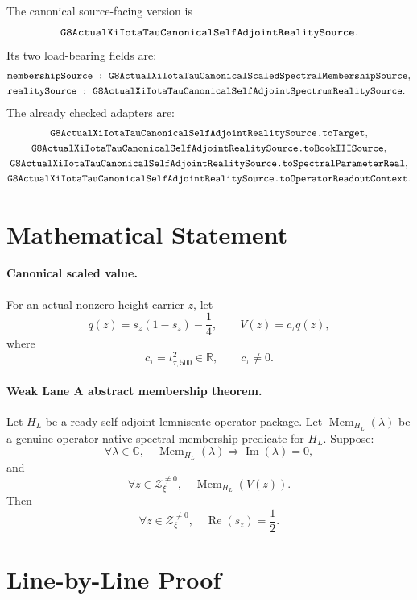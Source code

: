 \documentclass[11pt]{article}
\newcommand{\im}{\operatorname{Im}}
\newcommand{\re}{\operatorname{Re}}
\newcommand{\Mem}{\operatorname{Mem}}
\begin{document}
The canonical source-facing version is
\[
  \verb|G8ActualXiIotaTauCanonicalSelfAdjointRealitySource|.
\]
Its two load-bearing fields are:
\[
\begin{aligned}
&\verb|membershipSource : |
  \verb|G8ActualXiIotaTauCanonicalScaledSpectralMembershipSource|,\\
&\verb|realitySource : |
  \verb|G8ActualXiIotaTauCanonicalSelfAdjointSpectrumRealitySource|.
\end{aligned}
\]
The already checked adapters are:
\[
\begin{gathered}
  \verb|G8ActualXiIotaTauCanonicalSelfAdjointRealitySource.toTarget|,\\
  \verb|G8ActualXiIotaTauCanonicalSelfAdjointRealitySource.toBookIIISource|,\\
  \verb|G8ActualXiIotaTauCanonicalSelfAdjointRealitySource.toSpectralParameterReal|,\\
  \verb|G8ActualXiIotaTauCanonicalSelfAdjointRealitySource.toOperatorReadoutContext|.
\end{gathered}
\]

\section*{Mathematical Statement}

\paragraph{Canonical scaled value.}
For an actual nonzero-height carrier \(z\), let
\[
  q(z)=s_z(1-s_z)-\frac14,
  \qquad
  V(z)=c_\tau q(z),
\]
where
\[
  c_\tau=\iota_{\tau,500}^2\in\mathbb{R},\qquad c_\tau\ne0.
\]

\paragraph{Weak Lane A abstract membership theorem.}
Let \(H_L\) be a ready self-adjoint lemniscate operator package.  Let
\(\Mem_{H_L}(\lambda)\) be a genuine operator-native spectral membership
predicate for \(H_L\).  Suppose:
\[
  \forall \lambda\in\mathbb{C},\quad
  \Mem_{H_L}(\lambda)\Rightarrow \im(\lambda)=0,
\]
and
\[
  \forall z\in\mathcal Z_{\xi}^{\ne0},\quad
  \Mem_{H_L}(V(z)).
\]
Then
\[
  \forall z\in\mathcal Z_{\xi}^{\ne0},\quad
  \re(s_z)=\frac12.
\]

\section*{Line-by-Line Proof}
\end{document}
